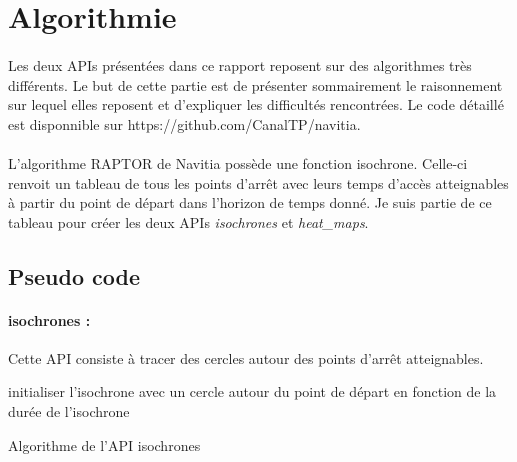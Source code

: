 \documentclass[a4paper]{report}
\begin{document}
\section{Algorithmie}

\paragraph{} Les deux APIs présentées dans ce rapport reposent sur des algorithmes très différents. Le but de cette partie est de présenter sommairement le raisonnement sur lequel elles reposent et d'expliquer les difficultés rencontrées. Le code détaillé est disponnible sur \color{blue} https://github.com/CanalTP/navitia. 

\color{black}
\paragraph{}L'algorithme RAPTOR de Navitia possède une fonction isochrone. Celle-ci renvoit un tableau de tous les points d'arrêt avec leurs temps d'accès atteignables à partir du point de départ dans l'horizon de temps donné. Je suis partie de ce tableau pour créer les deux APIs \emph{isochrones} et \emph{heat\_maps}.

\subsection{Pseudo code}

\paragraph{isochrones :} Cette API consiste à tracer des cercles autour des points d'arrêt atteignables.
\newline

\begin{algorithm}[H]
 initialiser l'isochrone avec un cercle autour du point de départ en fonction de la durée de l'isochrone\;
 \caption{Algorithme de l'API isochrones}
\end{algorithm}
\end{document}
